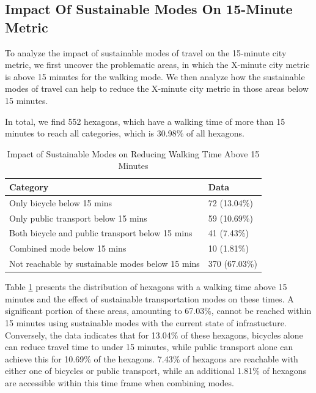 \subsection{Impact Of Sustainable Modes On 15-Minute Metric}
\label{subsec:impact_of_sustainable_modes_on_15_minute_metric}

To analyze the impact of sustainable modes of travel on the 15-minute city metric, we first uncover the problematic areas, in which the X-minute city metric is above 15 minutes for the walking mode.
We then analyze how the sustainable modes of travel can help to reduce the X-minute city metric in those areas below 15 minutes.

In total, we find 552 hexagons, which have a walking time of more than 15 minutes to reach all categories, which is 30.98\% of all hexagons.

\begin{table}[h]
  \centering
  \begin{tabular}{|l|l|}
    \hline
    \textbf{Category}                                          & \textbf{Data}                \\ \hline
    Only bicycle below 15 mins                                 & 72 (13.04\%)                 \\ \hline
    Only public transport below 15 mins                        & 59 (10.69\%)                 \\ \hline
    Both bicycle and public transport below 15 mins            & 41 (7.43\%)                  \\ \hline
    Combined mode below 15 mins                                & 10 (1.81\%)                  \\ \hline
    Not reachable by sustainable modes below 15 mins           & 370 (67.03\%)                \\ \hline
  \end{tabular}
  \caption{Impact of Sustainable Modes on Reducing Walking Time Above 15 Minutes}
  \label{table:hexagons_with_walking_time_above_15_minutes}
\end{table}

Table \ref{table:hexagons_with_walking_time_above_15_minutes} presents the distribution of hexagons with a walking time above 15 minutes and the effect of sustainable transportation modes on these times. 
A significant portion of these areas, amounting to 67.03\%, cannot be reached within 15 minutes using sustainable modes with the current state of infrastucture. 
Conversely, the data indicates that for 13.04\% of these hexagons, bicycles alone can reduce travel time to under 15 minutes, while public transport alone can achieve this for 10.69\% of the hexagons. 
7.43\% of hexagons are reachable with either one of bicycles or public transport, while an additional 1.81\% of hexagons are accessible within this time frame when combining  modes. 

